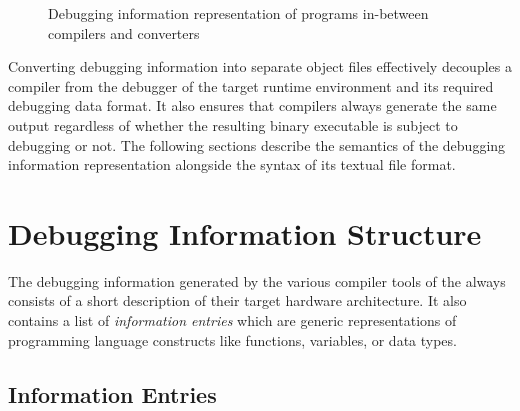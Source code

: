 \begin{figure}
\caption[Debugging information representation of programs]{Debugging information representation of programs in-between compilers and converters}
\label{fig:dbgdataflow}
\end{figure}

Converting debugging information into separate object files effectively decouples a compiler from the debugger of the target runtime environment and its required debugging data format.
It also ensures that compilers always generate the same output regardless of whether the resulting binary executable is subject to debugging or not.
The following sections describe the semantics of the debugging information representation alongside the syntax of its textual file format.

\section{Debugging Information Structure}

The debugging information generated by the various compiler tools of the \ecs{} always consists of a short description of their target hardware architecture.
It also contains a list of \emph{information entries} which are generic representations of programming language constructs like functions, variables, or data types.

\subsection{Information Entries}\label{sec:dbginformationentries}

